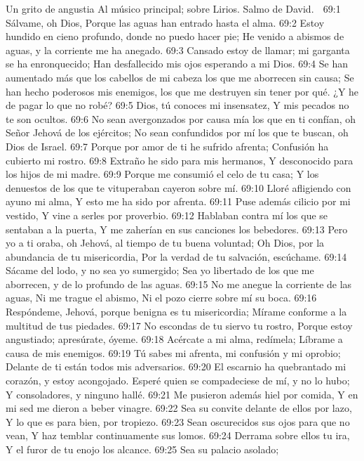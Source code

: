 Un grito de angustia 
Al músico principal; sobre Lirios. Salmo de David. 

69:1 Sálvame, oh Dios, 
Porque las aguas han entrado hasta el alma. 
69:2 Estoy hundido en cieno profundo, donde no puedo hacer pie; 
He venido a abismos de aguas, y la corriente me ha anegado. 
69:3 Cansado estoy de llamar; mi garganta se ha enronquecido; 
Han desfallecido mis ojos esperando a mi Dios. 
69:4 Se han aumentado más que los cabellos de mi cabeza los que me aborrecen sin causa; 
Se han hecho poderosos mis enemigos, los que me destruyen sin tener por qué. 
¿Y he de pagar lo que no robé? 
69:5 Dios, tú conoces mi insensatez, 
Y mis pecados no te son ocultos. 
69:6 No sean avergonzados por causa mía los que en ti confían, oh Señor Jehová de los ejércitos; 
No sean confundidos por mí los que te buscan, oh Dios de Israel. 
69:7 Porque por amor de ti he sufrido afrenta; 
Confusión ha cubierto mi rostro. 
69:8 Extraño he sido para mis hermanos, 
Y desconocido para los hijos de mi madre. 
69:9 Porque me consumió el celo de tu casa; 
Y los denuestos de los que te vituperaban cayeron sobre mí. 
69:10 Lloré afligiendo con ayuno mi alma, 
Y esto me ha sido por afrenta. 
69:11 Puse además cilicio por mi vestido, 
Y vine a serles por proverbio. 
69:12 Hablaban contra mí los que se sentaban a la puerta, 
Y me zaherían en sus canciones los bebedores. 
69:13 Pero yo a ti oraba, oh Jehová, al tiempo de tu buena voluntad; 
Oh Dios, por la abundancia de tu misericordia, 
Por la verdad de tu salvación, escúchame. 
69:14 Sácame del lodo, y no sea yo sumergido; 
Sea yo libertado de los que me aborrecen, y de lo profundo de las aguas. 
69:15 No me anegue la corriente de las aguas, 
Ni me trague el abismo, 
Ni el pozo cierre sobre mí su boca. 
69:16 Respóndeme, Jehová, porque benigna es tu misericordia; 
Mírame conforme a la multitud de tus piedades. 
69:17 No escondas de tu siervo tu rostro, 
Porque estoy angustiado; apresúrate, óyeme. 
69:18 Acércate a mi alma, redímela; 
Líbrame a causa de mis enemigos. 
69:19 Tú sabes mi afrenta, mi confusión y mi oprobio; 
Delante de ti están todos mis adversarios. 
69:20 El escarnio ha quebrantado mi corazón, y estoy acongojado. 
Esperé quien se compadeciese de mí, y no lo hubo; 
Y consoladores, y ninguno hallé. 
69:21 Me pusieron además hiel por comida, 
Y en mi sed me dieron a beber vinagre. 
69:22 Sea su convite delante de ellos por lazo, 
Y lo que es para bien, por tropiezo. 
69:23 Sean oscurecidos sus ojos para que no vean, 
Y haz temblar continuamente sus lomos. 
69:24 Derrama sobre ellos tu ira, 
Y el furor de tu enojo los alcance. 
69:25 Sea su palacio asolado; 
